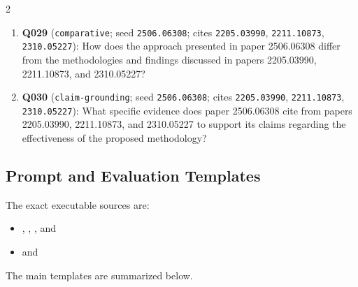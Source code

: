 \documentclass[10pt]{article}
\begin{document}
{\begin{multicols}{2}
\begin{enumerate}[leftmargin=1.0em,itemsep=0.05em,topsep=0pt,parsep=0pt]
  \item \textbf{Q029} (\texttt{comparative}; seed \texttt{2506.06308}; cites \texttt{2205.03990}, \texttt{2211.10873}, \texttt{2310.05227}): How does the approach presented in paper 2506.06308 differ from the methodologies and findings discussed in papers 2205.03990, 2211.10873, and 2310.05227?
  \item \textbf{Q030} (\texttt{claim-grounding}; seed \texttt{2506.06308}; cites \texttt{2205.03990}, \texttt{2211.10873}, \texttt{2310.05227}): What specific evidence does paper 2506.06308 cite from papers 2205.03990, 2211.10873, and 2310.05227 to support its claims regarding the effectiveness of the proposed methodology?
\end{enumerate}
\end{multicols}
}

\subsection{Prompt and Evaluation Templates}

The exact executable sources are:
{\footnotesize
\begin{itemize}[leftmargin=1.5em,itemsep=0.05em]
  \item {}, , , and 
  \item {} and 
\end{itemize}
}
The main templates are summarized below.
\end{document}
